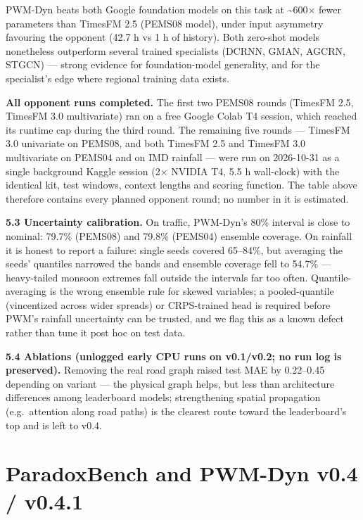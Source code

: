 \documentclass[
  10pt,
]{article}
\begin{document}
PWM-Dyn beats both Google foundation models on this task at
\textasciitilde600× fewer parameters than TimesFM 2.5 (PEMS08 model), under input asymmetry
favouring the opponent (42.7 h vs 1 h of history). Both zero-shot models
nonetheless outperform several trained specialists (DCRNN, GMAN, AGCRN,
STGCN) --- strong evidence for foundation-model generality, and for the
specialist's edge where regional training data exists.

\textbf{All opponent runs completed.} The first two PEMS08 rounds
(TimesFM 2.5, TimesFM 3.0 multivariate) ran on a free Google Colab T4
session, which reached its runtime cap during the third round. The
remaining five rounds --- TimesFM 3.0 univariate on PEMS08, and both
TimesFM 2.5 and TimesFM 3.0 multivariate on PEMS04 and on IMD rainfall
--- were run on 2026-10-31 as a single background Kaggle session (2×
NVIDIA T4, 5.5 h wall-clock) with the identical kit, test windows,
context lengths and scoring function. The table above therefore contains
every planned opponent round; no number in it is estimated.

\textbf{5.3 Uncertainty calibration.} On traffic, PWM-Dyn's 80\%
interval is close to nominal: 79.7\% (PEMS08) and 79.8\% (PEMS04)
ensemble coverage. On rainfall it is honest to report a failure: single
seeds covered 65--84\%, but averaging the seeds' quantiles narrowed the
bands and ensemble coverage fell to 54.7\% --- heavy-tailed monsoon
extremes fall outside the intervals far too often. Quantile-averaging is
the wrong ensemble rule for skewed variables; a pooled-quantile
(vincentized across wider spreads) or CRPS-trained head is required
before PWM's rainfall uncertainty can be trusted, and we flag this as a
known defect rather than tune it post hoc on test data.

\textbf{5.4 Ablations (unlogged early CPU runs on v0.1/v0.2; no run log is
preserved).} Removing the real road graph raised test MAE by 0.22--0.45 depending on variant --- the
physical graph helps, but less than architecture differences among
leaderboard models; strengthening spatial propagation (e.g.~attention
along road paths) is the clearest route toward the leaderboard's top and
is left to v0.4.

\section{ParadoxBench and PWM-Dyn v0.4 / v0.4.1}
\end{document}
